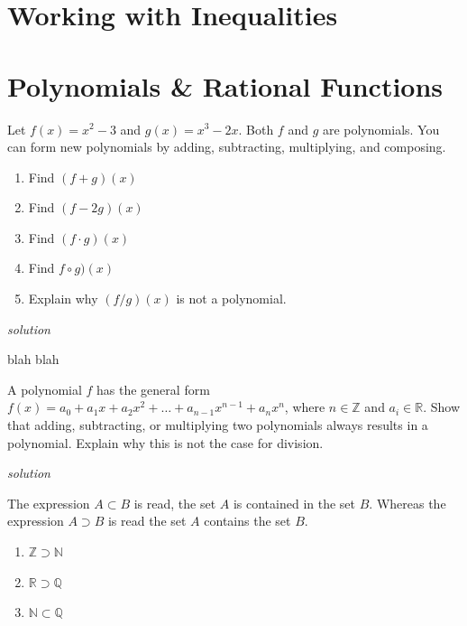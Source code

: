 \documentclass{amsbook}
\begin{document}

\section{Working with Inequalities}


\section{Polynomials \& Rational Functions}



\begin{Exercise}[title={Polynomials I}, difficulty=0 , label=1a1 ]
	Let $f(x)=x^2-3$ and $g(x)=x^3-2x$. Both $f$ and $g$ are polynomials. You can form new polynomials by adding, subtracting, multiplying, and composing. 
        \begin{enumerate}
            \item Find $(f+g)(x)$
            \item Find $(f-2g)(x)$
            \item Find $(f\cdot g)(x)$
            \item Find $f \circ g)(x)$
            \item Explain why $(f/g)(x)$ is not a polynomial.
        \end{enumerate}

	\hfill \emph{solution} 
\end{Exercise}

\begin{Answer}[ref={1a1}]
	blah blah
\end{Answer}

\begin{Exercise}[title={Defining Polynomials}, difficulty=1, label=1a2]
A polynomial $f$ has the general form $f(x)=a_0+a_1 x + a_2 x^2 + \ldots +a_{n-1}x^{n-1} + a_nx^n$, where $n \in \mathbb{Z}$ and $a_i \in \mathbb{R}$. Show that adding, subtracting, or multiplying two polynomials always results in a polynomial. Explain why this is not the case for division.

    \hfill \emph{solution} 
\end{Exercise}

\begin{Answer}[ref={1a2}]
    The expression $A \subset B$ is read, the set $A$ is contained in the set $B$. Whereas the expression $A \supset B$ is read the set $A$ contains the set $B$.
    \begin{enumerate}
        \item $\mathbb{Z}\supset \mathbb{N}$
        \item $\mathbb{R}\supset \mathbb{Q}$
        \item $\mathbb{N} \subset \mathbb{Q}$
    \end{enumerate}
\end{Answer}
\end{document}
